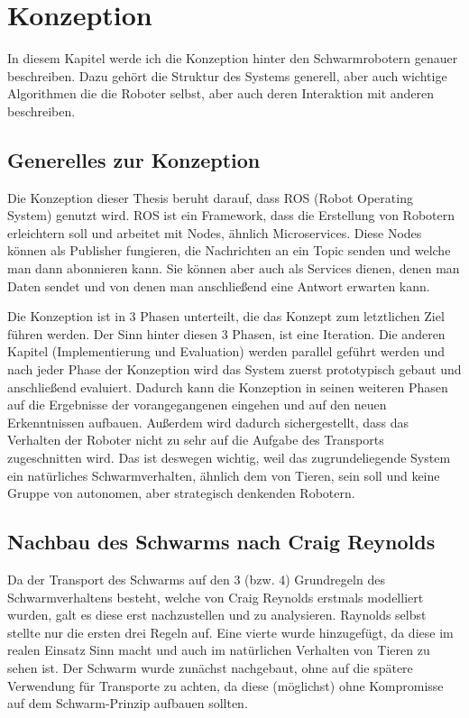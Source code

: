 \chapter{Konzeption}\label{ch:Konzeption}

In diesem Kapitel werde ich die Konzeption hinter den Schwarmrobotern genauer beschreiben. Dazu gehört die Struktur des Systems generell, aber auch wichtige Algorithmen die die Roboter selbst, aber auch deren Interaktion mit anderen beschreiben.

\section{Generelles zur Konzeption}

Die Konzeption dieser Thesis beruht darauf, dass ROS (Robot Operating System) genutzt wird. ROS ist ein Framework, dass die Erstellung von Robotern erleichtern soll und arbeitet mit Nodes, ähnlich Microservices. Diese Nodes können als Publisher fungieren, die Nachrichten an ein Topic senden und welche man dann abonnieren kann. Sie können aber auch als Services dienen, denen man Daten sendet und von denen man anschließend eine Antwort erwarten kann.

Die Konzeption ist in 3 Phasen unterteilt, die das Konzept zum letztlichen Ziel führen werden. Der Sinn hinter diesen 3 Phasen, ist eine Iteration. Die anderen Kapitel (Implementierung und Evaluation) werden parallel geführt werden und nach jeder Phase der Konzeption wird das System zuerst prototypisch gebaut und anschließend evaluiert. Dadurch kann die Konzeption in seinen weiteren Phasen auf die Ergebnisse der vorangegangenen eingehen und auf den neuen Erkenntnissen aufbauen. Außerdem wird dadurch sichergestellt, dass das Verhalten der Roboter nicht zu sehr auf die Aufgabe des Transports zugeschnitten wird. Das ist deswegen wichtig, weil das zugrundeliegende System ein natürliches Schwarmverhalten, ähnlich dem von Tieren, sein soll und keine Gruppe von autonomen, aber strategisch denkenden Robotern.

\section{Nachbau des Schwarms nach Craig Reynolds}
Da der Transport des Schwarms auf den 3 (bzw. 4) Grundregeln des Schwarmverhaltens besteht, welche von Craig Reynolds erstmals modelliert wurden\cite{CraigReynolds_Boids}, galt es diese erst nachzustellen und zu analysieren. Raynolds selbst stellte nur die ersten drei Regeln auf. Eine vierte wurde hinzugefügt, da diese im realen Einsatz Sinn macht und auch im natürlichen Verhalten von Tieren zu sehen ist. Der Schwarm wurde zunächst nachgebaut, ohne auf die spätere Verwendung für Transporte zu achten, da diese (möglichst) ohne Kompromisse auf dem Schwarm-Prinzip aufbauen sollten. 

